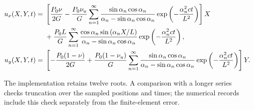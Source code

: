 
 \begin{align}
  u_x(X,Y,t)
  ={}&\left[
  \frac{P_0\nu}{2G}
  -\frac{P_0\nu_u}{G}
  \sum_{n=1}^{\infty}
  \frac{\sin\alpha_n\cos\alpha_n}
  {\alpha_n-\sin\alpha_n\cos\alpha_n}
  \exp\left(-\frac{\alpha_n^2ct}{L^2}\right)
  \right]X
  \notag\\
  &\mathbin{+}\frac{P_0L}{G}
  \sum_{n=1}^{\infty}
  \frac{\cos\alpha_n\sin\left(\alpha_n X/L\right)}
  {\alpha_n-\sin\alpha_n\cos\alpha_n}
  \exp\left(-\frac{\alpha_n^2ct}{L^2}\right),
  \notag
\\
  u_y(X,Y,t)
  ={}&\left[
  -\frac{P_0(1-\nu)}{2G}
  +\frac{P_0(1-\nu_u)}{G}
  \sum_{n=1}^{\infty}
  \frac{\sin\alpha_n\cos\alpha_n}
  {\alpha_n-\sin\alpha_n\cos\alpha_n}
  \exp\left(-\frac{\alpha_n^2ct}{L^2}\right)
  \right]Y.
  \label{eq:mandel-vertical-displacement-series}
 \end{align}

The implementation retains twelve roots.  A comparison with a longer series
checks truncation over the sampled positions and times; the numerical records
include this check separately from the finite-element error.
